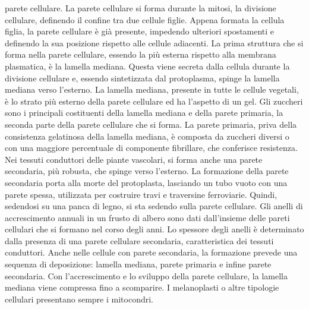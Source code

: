 \documentclass[11pt, a4paper]{article}
\begin{document}
\begin{spacing}{1.15}
parete cellulare. La parete cellulare si forma durante la mitosi, la divisione cellulare, definendo il confine tra due cellule figlie. Appena formata la cellula figlia, la parete cellulare è già presente, impedendo ulteriori spostamenti e definendo la sua posizione rispetto alle cellule adiacenti. La prima struttura che si forma nella parete cellulare, essendo la più esterna rispetto alla membrana plasmatica, è la lamella mediana. Questa viene secreta dalla cellula durante la divisione cellulare e, essendo sintetizzata dal protoplasma, spinge la lamella mediana verso l'esterno. La lamella mediana, presente in tutte le cellule vegetali, è lo strato più esterno della parete cellulare ed ha l'aspetto di un gel. Gli zuccheri sono i principali costituenti della lamella mediana e della parete primaria, la seconda parte della parete cellulare che si forma. La parete primaria, priva della consistenza gelatinosa della lamella mediana, è composta da zuccheri diversi o con una maggiore percentuale di componente fibrillare, che conferisce resistenza. Nei tessuti conduttori delle piante vascolari, si forma anche una parete secondaria, più robusta, che spinge verso l'esterno. La formazione della parete secondaria porta alla morte del protoplasta, lasciando un tubo vuoto con una parete spessa, utilizzata per costruire travi e traversine ferroviarie. Quindi, sedendosi su una panca di legno, si sta sedendo sulla parete cellulare. Gli anelli di accrescimento annuali in un frusto di albero sono dati dall'insieme delle pareti cellulari che si formano nel corso degli anni. Lo spessore degli anelli è determinato dalla presenza di una parete cellulare secondaria, caratteristica dei tessuti conduttori. Anche nelle cellule con parete secondaria, la formazione prevede una sequenza di deposizione: lamella mediana, parete primaria e infine parete secondaria. Con l'accrescimento e lo sviluppo della parete cellulare, la lamella mediana viene compressa fino a scomparire. I melanoplasti o altre tipologie cellulari presentano sempre i mitocondri.
\end{spacing}
\end{document}
